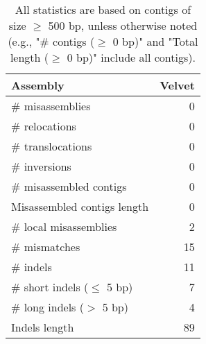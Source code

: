 \documentclass[12pt,a4paper]{article}
\begin{document}
\begin{table}[ht]
\begin{center}
\caption{All statistics are based on contigs of size $\geq$ 500 bp, unless otherwise noted (e.g., "\# contigs ($\geq$ 0 bp)" and "Total length ($\geq$ 0 bp)" include all contigs).}
\begin{tabular}{|l*{1}{|r}|}
\hline
Assembly & Velvet \\ \hline
\# misassemblies & 0 \\ \hline
\hspace{5mm}\# relocations & 0 \\ \hline
\hspace{5mm}\# translocations & 0 \\ \hline
\hspace{5mm}\# inversions & 0 \\ \hline
\# misassembled contigs & 0 \\ \hline
Misassembled contigs length & 0 \\ \hline
\# local misassemblies & 2 \\ \hline
\# mismatches & 15 \\ \hline
\# indels & 11 \\ \hline
\hspace{5mm}\# short indels ($\leq$ 5 bp) & 7 \\ \hline
\hspace{5mm}\# long indels ($>$ 5 bp) & 4 \\ \hline
Indels length & 89 \\ \hline
\end{tabular}
\end{center}
\end{table}
\end{document}
